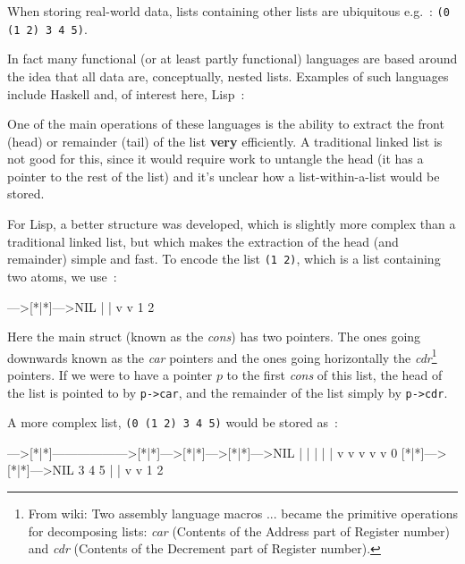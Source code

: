 \label{ex:carcdr}

When storing real-world data, lists containing other lists are ubiquitous e.g.~:
\verb^(0 (1 2) 3 4 5)^.

\noindent In fact many functional (or at least partly functional) languages are
based around the idea that all data are, conceptually, nested lists. Examples
of such languages include Haskell and, of interest here, Lisp~:

One of the main operations of these languages is the ability to extract
the front (head) or remainder (tail) of the list {\bf very} efficiently.   
A traditional linked list is not good for this, since it would require work
to untangle the head (it has a pointer to the rest of the list) and
it's unclear how a list-within-a-list would be stored.

For Lisp, a better structure was developed, which is slightly more complex than
a traditional linked list, but which makes the extraction of the head (and remainder)
simple and fast. To encode the list \verb^(1 2)^, which is a list containing two atoms,
we use~:
\begin{terminaloutput}
[*|*]--->[*|*]--->NIL
 |        |
 v        v
 1        2
\end{terminaloutput}

\noindent Here the main struct (known as the {\it cons})
has two pointers.  The ones going
downwards known as the {\it car} pointers and the ones going horizontally
the {\it cdr}\footnote{ From wiki: Two assembly language macros $...$
became the primitive operations for decomposing lists: {\it car} (Contents
of the Address part of Register number) and {\it cdr} (Contents of the
Decrement part of Register number).  } pointers.
If we were to have a pointer $p$ to the first {\it cons} of this list, the head of the
list is pointed to by \verb^p->car^, and the remainder of the list simply by \verb^p->cdr^.

\newpage 

A more complex list, \verb^(0 (1 2) 3 4 5)^ would be stored as~:
\begin{terminaloutput}
[*|*]--->[*|*]------------------>[*|*]--->[*|*]--->[*|*]--->NIL
 |        |                       |        |        |
 v        v                       v        v        v
 0       [*|*]--->[*|*]--->NIL    3        4        5
          |        |
          v        v
          1        2
\end{terminaloutput}

